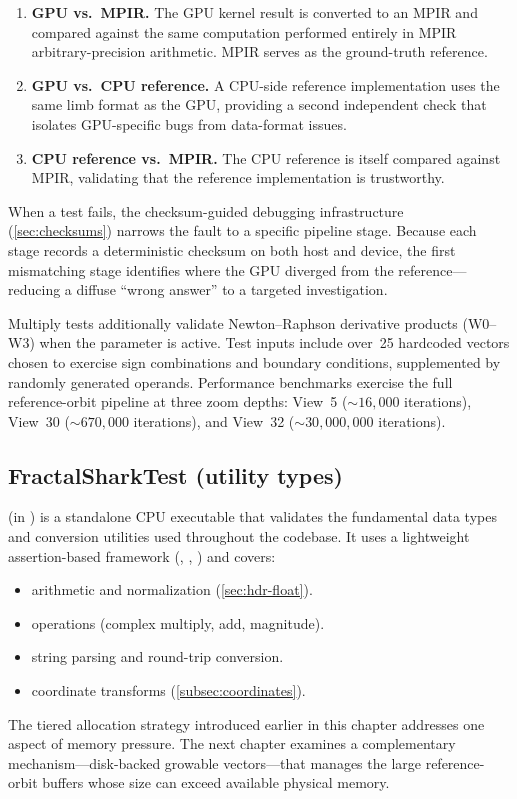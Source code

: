 \begin{enumerate}
  \item \textbf{GPU vs.\ MPIR.}  The GPU kernel result is converted to
        an MPIR  and compared against the same computation
        performed entirely in MPIR arbitrary-precision arithmetic.  MPIR
        serves as the ground-truth reference.
  \item \textbf{GPU vs.\ CPU reference.}  A CPU-side reference
        implementation uses the same  limb format as
        the GPU, providing a second independent check that isolates
        GPU-specific bugs from data-format issues.
  \item \textbf{CPU reference vs.\ MPIR.}  The CPU reference is itself
        compared against MPIR, validating that the reference
        implementation is trustworthy.
\end{enumerate}

\noindent
When a test fails, the checksum-guided debugging infrastructure
(\cref{sec:checksums}) narrows the fault to a specific pipeline stage.
Because each stage records a deterministic checksum on both host and
device, the first mismatching stage identifies where the GPU diverged
from the reference---reducing a diffuse ``wrong answer'' to a targeted
investigation.

Multiply tests additionally validate Newton--Raphson derivative products
(W0--W3) when the  parameter is active.  Test
inputs include over~25 hardcoded vectors chosen to exercise sign
combinations and boundary conditions, supplemented by randomly generated
operands.  Performance benchmarks exercise the full reference-orbit
pipeline at three zoom depths: View~5 (${\sim}16{,}000$ iterations),
View~30 (${\sim}670{,}000$ iterations), and View~32
(${\sim}30{,}000{,}000$ iterations).

\subsection{FractalSharkTest (utility types)}
\label{subsec:fractalsharktest}

 (in ) is a standalone
CPU executable that validates the fundamental data types and conversion
utilities used throughout the codebase.  It uses a lightweight
assertion-based framework (, ,
) and covers:

\begin{itemize}
  \item {} arithmetic and normalization
        (\cref{sec:hdr-float}).
  \item {} operations (complex multiply, add,
        magnitude).
  \item {} string parsing and round-trip conversion.
  \item {} coordinate transforms
        (\cref{subsec:coordinates}).
\end{itemize}

The tiered allocation strategy introduced earlier in this chapter addresses one aspect of memory
pressure.  The next chapter examines a complementary mechanism---disk-backed
growable vectors---that manages the large reference-orbit buffers whose size
can exceed available physical memory.
